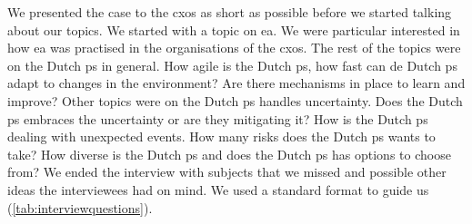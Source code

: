 We presented the case to the \glspl{cxo} as short as possible before we started talking about our topics. We started with a topic on \gls{ea}. We were particular interested in how \gls{ea} was practised in the organisations of the \glspl{cxo}. The rest of the topics were on the Dutch \gls{ps} in general. How \gls{agile} is the Dutch \gls{ps}, how fast can de Dutch \gls{ps} adapt to changes in the environment? Are there mechanisms in place to learn and improve? Other topics were on the Dutch \gls{ps} handles \gls{uncertainty}. Does the Dutch \gls{ps} embraces the \gls{uncertainty} or are they mitigating it? How is the Dutch \gls{ps} dealing with unexpected events. How many risks does the Dutch \gls{ps} wants to take? How diverse is the Dutch \gls{ps} and does the Dutch \gls{ps} has options to choose from? We ended the interview with subjects that we missed and possible other ideas the interviewees had on mind. We used a standard format to guide us (\cref{tab:interviewquestions}).

